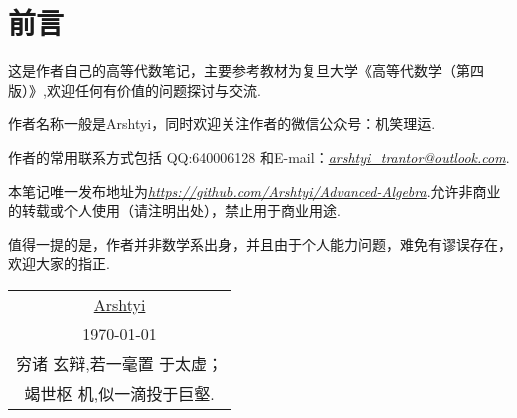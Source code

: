 \newpage
\section*{前言}
\thispagestyle{empty}
这是作者自己的高等代数笔记，主要参考教材为复旦大学《高等代数学（第四版）》,欢迎任何有价值的问题探讨与交流.

作者名称一般是Arshtyi，同时欢迎关注作者的微信公众号：机笑理运.

作者的常用联系方式包括 QQ:640006128 和E-mail：\textit{\url{arshtyi_trantor@outlook.com}}.

本笔记唯一发布地址为\textit{\url{https://github.com/Arshtyi/Advanced-Algebra}}.允许非商业的转载或个人使用（请注明出处），禁止用于商业用途.

值得一提的是，作者并非数学系出身，并且由于个人能力问题，难免有谬误存在，欢迎大家的指正.
\begin{flushright}
    \begin{tabular}{c}
        \href{https://github.com/Arshtyi}{Arshtyi} \\
        \today                                     \\ 穷诸
        玄辩,若一毫置
        于太虚；                                       \\ 竭世枢
        机,似一滴投于巨壑.
    \end{tabular}
\end{flushright}
\thispagestyle{empty}